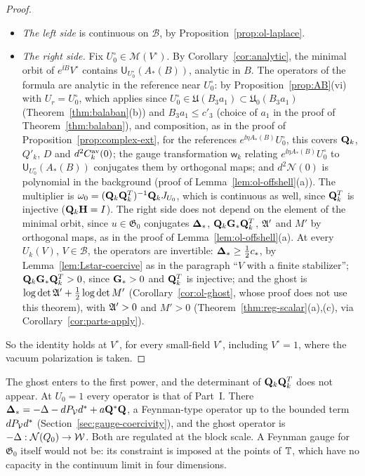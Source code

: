 \begin{proof}
\begin{itemize}
\item \emph{The left side} is continuous on $\mathcal B$, by Proposition~\ref{prop:ol-laplace}.
\item \emph{The right side.} Fix $U_0^\circ\in\mathscr M(V^\circ)$. By Corollary~\ref{cor:analytic}, the minimal orbit of $e^{\ii B}V^\circ$ contains $\mathsf U_{U_0^\circ}(A_*(B))$, analytic in $B$. The operators of the formula are analytic in the reference near $U_0^\circ$: by Proposition~\ref{prop:AB}(vi) with $U_r=U_0^\circ$, which applies since $U_0^\circ\in\mathfrak U(B_3a_1)\subset\mathfrak U_0(B_3a_1)$ (Theorem~\ref{thm:balaban}(b)) and $B_3a_1\le c'_3$ (choice of $a_1$ in the proof of Theorem~\ref{thm:balaban}), and composition, as in the proof of Proposition~\ref{prop:complex-ext}, for the references $e^{\ii\eta A_*(B)}U_0^\circ$, this covers $\mathbf Q_k$, $Q'_k$, $D$ and $d^2C^{\rm av}_k(0)$; the gauge transformation $\mathsf w_k$ relating $e^{\ii\eta A_*(B)}U_0^\circ$ to $\mathsf U_{U_0^\circ}(A_*(B))$ conjugates them by orthogonal maps; and $d^2\mathcal N(0)$ is polynomial in the background (proof of Lemma~\ref{lem:ol-offshell}(a)). The multiplier is $\omega_0=(\mathbf Q_k\mathbf Q_k^T)^{-1}\mathbf Q_kJ_{U_0}$, which is continuous as well, since $\mathbf Q_k^T$ is injective ($\mathbf Q_k\mathbf H=I$). The right side does not depend on the element of the minimal orbit, since $u\in\mathfrak G_0$ conjugates $\boldsymbol{\Delta}_*$, $\mathbf Q_k\mathbf G_*\mathbf Q_k^T$, $\mathfrak A'$ and $M'$ by orthogonal maps, as in the proof of Lemma~\ref{lem:ol-offshell}(a). At every $U_k(V)$, $V\in\mathcal B$, the operators are invertible: $\boldsymbol{\Delta}_*\ge\frac12c_*$, by Lemma~\ref{lem:Lstar-coercive} as in the paragraph ``$V$ with a finite stabilizer''; $\mathbf Q_k\mathbf G_*\mathbf Q_k^T>0$, since $\mathbf G_*>0$ and $\mathbf Q_k^T$ is injective; and the ghost is $\log\det\mathfrak A'+\frac12\log\det M'$ (Corollary~\ref{cor:ol-ghost}, whose proof does not use this theorem), with $\mathfrak A'>0$ and $M'>0$ (Theorem~\ref{thm:reg-scalar}(a),(c), via Corollary~\ref{cor:parts-apply}).
\end{itemize}
So the identity holds at $V^\circ$, for every small-field $V^\circ$, including $V^\circ=1$, where the vacuum polarization is taken.
\end{proof}

The ghost enters to the first power, and the determinant of $\mathbf Q_k\mathbf Q_k^T$ does not appear. At $U_0=1$ every operator is that of Part~I. There $\boldsymbol{\Delta}_*=-\Delta-dP_\mathcal V d^*+a\mathbf Q^*\mathbf Q$, a Feynman-type operator up to the bounded term $dP_\mathcal V d^*$ (Section~\ref{sec:gauge-coercivity}), and the ghost operator is $-\Delta:\mathcal N(Q_0)\to\mathcal W$. Both are regulated at the block scale. A Feynman gauge for $\mathfrak G_0$ itself would not be: its constraint is imposed at the points of $\mathbb T$, which have no capacity in the continuum limit in four dimensions.


